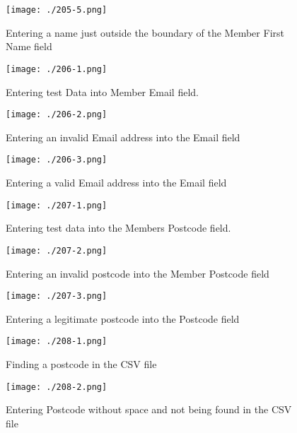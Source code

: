 \begin{figure}[H]
    \texttt{[image: ./205-5.png]}
    \caption{Entering a name just outside the boundary of the Member First Name field} \label{fig:205-5}
\end{figure}

\begin{figure}[H]
    \texttt{[image: ./206-1.png]}
    \caption{Entering test Data into Member Email field.} \label{fig:206-1}
\end{figure}

\begin{figure}[H]
    \texttt{[image: ./206-2.png]}
    \caption{Entering an invalid Email address into the Email field} \label{fig:206-2}
\end{figure}

\begin{figure}[H]
    \texttt{[image: ./206-3.png]}
    \caption{Entering a valid Email address into the Email field} \label{fig:206-3}
\end{figure}

\begin{figure}[H]
    \texttt{[image: ./207-1.png]}
    \caption{Entering test data into the Members Postcode field.} \label{fig:207-1}
\end{figure}

\begin{figure}[H]
    \texttt{[image: ./207-2.png]}
    \caption{Entering an invalid postcode into the Member Postcode field} \label{fig:207-2}
\end{figure}

\begin{figure}[H]
    \texttt{[image: ./207-3.png]}
    \caption{Entering a legitimate postcode into the Postcode field} \label{fig:207-3}
\end{figure}

\begin{figure}[H]
    \texttt{[image: ./208-1.png]}
    \caption{Finding a postcode in the CSV file} \label{fig:208-1}
\end{figure}

\begin{figure}[H]
    \texttt{[image: ./208-2.png]}
    \caption{Entering Postcode without space and not being found in the CSV file} \label{fig:208-2}
\end{figure}

